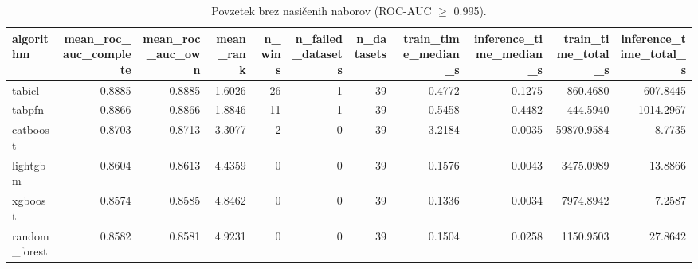 \begin{table}[htbp]
\centering
\caption{Povzetek brez nasičenih naborov (ROC-AUC $\geq$ 0.995).}
\label{tab:overall-nonsat}
\begin{tabular}{lrrrrrrrrrr}
\hline
algorithm & mean\_roc\_auc\_complete & mean\_roc\_auc\_own & mean\_rank & n\_wins & n\_failed\_datasets & n\_datasets & train\_time\_median\_s & inference\_time\_median\_s & train\_time\_total\_s & inference\_time\_total\_s \\
\hline
tabicl & 0.8885 & 0.8885 & 1.6026 & 26 & 1 & 39 & 0.4772 & 0.1275 & 860.4680 & 607.8445 \\
tabpfn & 0.8866 & 0.8866 & 1.8846 & 11 & 1 & 39 & 0.5458 & 0.4482 & 444.5940 & 1014.2967 \\
catboost & 0.8703 & 0.8713 & 3.3077 & 2 & 0 & 39 & 3.2184 & 0.0035 & 59870.9584 & 8.7735 \\
lightgbm & 0.8604 & 0.8613 & 4.4359 & 0 & 0 & 39 & 0.1576 & 0.0043 & 3475.0989 & 13.8866 \\
xgboost & 0.8574 & 0.8585 & 4.8462 & 0 & 0 & 39 & 0.1336 & 0.0034 & 7974.8942 & 7.2587 \\
random\_forest & 0.8582 & 0.8581 & 4.9231 & 0 & 0 & 39 & 0.1504 & 0.0258 & 1150.9503 & 27.8642 \\
\hline
\end{tabular}
\end{table}
